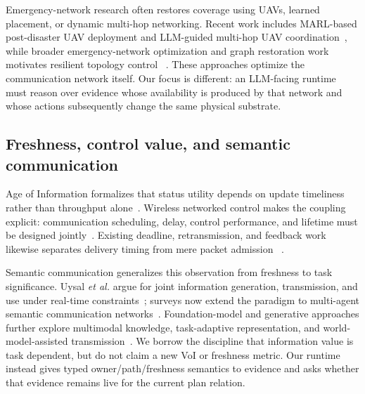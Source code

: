 \documentclass[journal,10pt]{IEEEtran}
\begin{document}
Emergency-network research often restores coverage using UAVs, learned placement, or dynamic
multi-hop networking. Recent work includes MARL-based post-disaster UAV deployment and LLM-guided
multi-hop UAV coordination~\cite{sharma2024uavmarl,xu2025uavllm}, while broader emergency-network
optimization and graph restoration work motivates resilient topology control
~\cite{icldc,icgrestore}. These approaches optimize the communication network itself. Our focus is
different: an LLM-facing runtime must reason over evidence whose availability is produced by that
network and whose actions subsequently change the same physical substrate.

\subsection{Freshness, control value, and semantic communication}
Age of Information formalizes that status utility depends on update timeliness rather than
throughput alone~\cite{kaul2012aoi,yates2021aoisurvey,bacinoglu1905}. Wireless networked control
makes the coupling explicit: communication scheduling, delay, control performance, and lifetime
must be designed jointly~\cite{park2018wncs,wang2021voi}. Existing deadline, retransmission, and
feedback work likewise separates delivery timing from mere packet admission
~\cite{razavivideo,kam2016deadline,wada2009timeout}.

Semantic communication generalizes this observation from freshness to task significance. Uysal
\emph{et al.} argue for joint information generation, transmission, and use under real-time
constraints~\cite{uysal2021semantic}; surveys now extend the paradigm to multi-agent semantic
communication networks~\cite{guo2025semcomnet}. Foundation-model and generative approaches
further explore multimodal knowledge, task-adaptive representation, and world-model-assisted
transmission~\cite{du2024distributedfm,sheng2025wirelessfm,jiang2025worldmodelsemcom}. We borrow
the discipline that information value is task dependent, but do not claim a new VoI or
freshness metric. Our runtime instead gives typed owner/path/freshness semantics to evidence and
asks whether that evidence remains live for the current plan relation.
\end{document}

